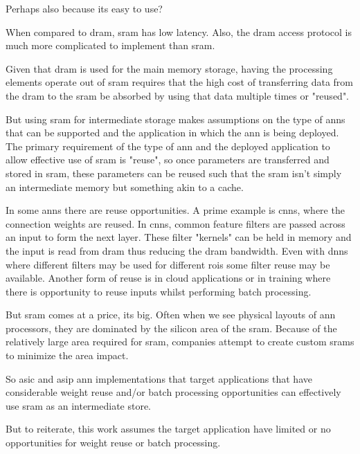 Perhaps also because its easy to use? 

When compared to \ac{dram}, \ac{sram} has low latency. Also, the \ac{dram} access protocol is much more complicated to implement than \ac{sram}. 

Given that \ac{dram} is used for the main memory storage, having the processing elements operate out of \ac{sram} requires that the high cost of transferring data from the \ac{dram} to the \ac{sram} be absorbed by using that data multiple times or "reused".

But using \ac{sram} for intermediate storage makes assumptions on the type of \acp{ann} that can be supported and the application in which the \ac{ann} is being deployed.
The primary requirement of the type of \ac{ann} and the deployed application to allow effective use of \ac{sram} is "reuse", so once parameters are transferred and stored in \ac{sram}, these parameters can be reused such that the \ac{sram} isn't simply an intermediate memory but something akin to a cache.

In some \ac{ann}s there are reuse opportunities. 
A prime example is \acp{cnn}, where the connection weights are reused. In \acp{cnn}, common feature filters are passed across an input to form the next layer. 
These filter "kernels" can be held in memory and the input is read from \ac{dram} thus reducing the \ac{dram} bandwidth.
Even with \ac{dnn}s where different filters may be used for different \acp{roi} some filter reuse may be available.
Another form of reuse is in cloud applications or in training where there is opportunity to reuse inputs whilst performing batch processing.

But \ac{sram} comes at a price, its big. Often when we see physical layouts of \ac{ann} processors, they are dominated by the silicon area of the \ac{sram}. 
Because of the relatively large area required for \ac{sram}, companies attempt to create custom \acp{sram} to minimize the area impact.

So \ac{asic} and \ac{asip} \ac{ann} implementations that target applications that have considerable weight reuse and/or batch processing opportunities can effectively use \ac{sram} as an intermediate store.

But to reiterate, this work assumes the target application have limited or no opportunities for weight reuse or batch processing.

\iffalse
So the question becomes, can a system employ \ac{dram} with minimal \ac{sram} and still meet the system requirements?
\fi

